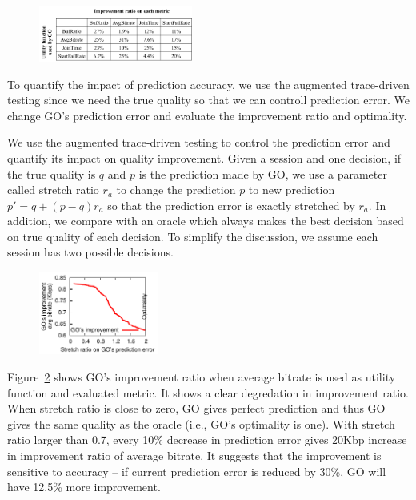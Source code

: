 \begin{figure}[h!]
\centering
 \includegraphics[width=0.45\textwidth] {figures/newfig/cross-metric.pdf}
\label{fig:cross-metrics}
\end{figure}



\label{subsec:impact-accuracy}

To quantify the impact of prediction accuracy, we use the augmented trace-driven testing since we need the true quality so that we can controll prediction error. We change GO's prediction error and evaluate the improvement ratio and optimality. 


We use the augmented trace-driven testing to control the prediction error and quantify its impact on quality improvement. Given a session and one decision, if the true quality is $q$ and $p$ is the prediction made by GO, we use a parameter called stretch ratio $r_a$ to change the prediction $p$ to new prediction $p'=q+(p-q)r_a$ so that the prediction error is exactly stretched by $r_a$. 
In addition, we compare with an oracle which always makes the best decision based on true quality of each decision. To simplify the discussion, we assume each session has two  possible decisions. 

\begin{figure}[h!]
\centering
 \includegraphics[width=0.35\textwidth] {figures/newfig/trendAccuracy-metricId1-keyGlobal-partition.pdf}
\label{fig:trace-accuracy-2}
\end{figure}

Figure~\ref{fig:trace-accuracy-2} shows GO's improvement ratio when average bitrate is used as utility function and evaluated metric.
It shows a clear degredation in improvement ratio. When stretch ratio is close to zero, GO gives perfect prediction and thus GO gives the same quality as the oracle (i.e., GO's optimality is one). With stretch ratio larger than 0.7, every 10\% decrease in prediction error gives 20Kbp increase in improvement ratio of average bitrate. It suggests that the improvement is sensitive to accuracy -- if current prediction error is reduced by 30\%, GO will have 12.5\% more improvement. 



